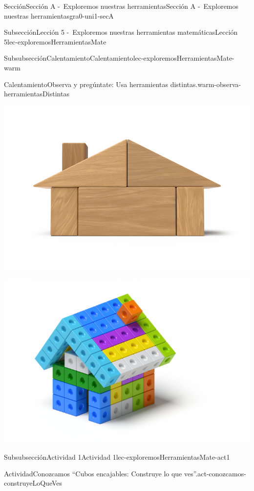 \documentclass[twoside,10pt,]{article}
\begin{document}
\begin{sectionptx}{Sección}{Sección A -~Exploremos nuestras herramientas}{}{Sección A -~Exploremos nuestras herramientas}{}{}{gra0-uni1-secA}
\begin{subsectionptx}{Subsección}{Lección 5 -~Exploremos nuestras herramientas matemáticas}{}{Lección 5}{}{}{lec-exploremosHerramientasMate}
\begin{subsubsectionptx}{Subsubsección}{Calentamiento}{}{Calentamiento}{}{}{lec-exploremosHerramientasMate-warm}
\begin{exploration}{Calentamiento}{Observa y pregúntate: Usa herramientas distintas.}{warm-observa-herramientasDistintas}
\begin{sidebyside}{2}{0.05}{0.05}{0.1}
\begin{sbspanel}{0.4}
\includegraphics[width=\linewidth]{external/png-source/K.1.A Beta Student Workbook.Woodhouse_withShadow.png}
\par
\includegraphics[width=\linewidth]{external/png-source/5.1.A2.House_withShadow.png}
\end{sbspanel}%
\end{sidebyside}%
\end{exploration}%
\end{subsubsectionptx}
%
%
\typeout{************************************************}
\typeout{************************************************}
%
\begin{subsubsectionptx}{Subsubsección}{Actividad 1}{}{Actividad 1}{}{}{lec-exploremosHerramientasMate-act1}
\begin{activity}{Actividad}{Conozcamos “Cubos encajables: Construye lo que ves”.}{act-conozcamos-construyeLoQueVes}%

\end{activity}
\end{subsubsectionptx}
\end{subsectionptx}
\end{sectionptx}
\end{document}
